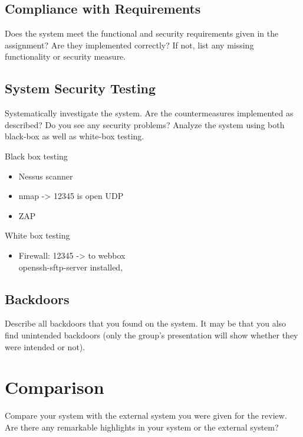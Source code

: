 \documentclass[english]{article}
\begin{document}
\subsection{Compliance with Requirements} 

Does the system meet the functional and security requirements given in the assignment? Are they implemented correctly? If not, list any missing functionality or security measure.


\subsection{System Security Testing}

Systematically investigate the system. Are the countermeasures implemented as described? Do you see any security problems? Analyze the system using both black-box as well as white-box testing.

Black box testing
\begin{itemize}
	\item Nessus scanner
	\item nmap -> 12345 is open UDP
	\item ZAP
\end{itemize}

White box testing

\begin{itemize}
	\item Firewall: 12345 -> to webbox\\ openssh-sftp-server installed,  
\end{itemize}


\subsection{Backdoors}

Describe all backdoors that you found on the system. It may be that you also find unintended backdoors (only the group's presentation will show whether they were intended or not).



\section{Comparison}

Compare your system with the external system you were given for the review. Are there any remarkable highlights in your system or the external system?
\end{document}
